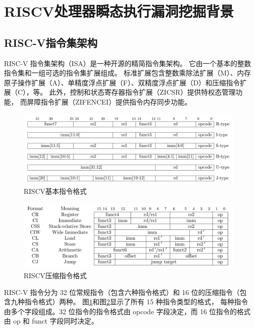 \cleardoublepage

\section{RISCV处理器瞬态执行漏洞挖掘背景}

\subsection{RISC-V指令集架构}

RISC-V 指令集架构（ISA）是一种开源的精简指令集架构\cite{riscv-isa-manual-all}。
它由一个基本的整数指令集和一组可选的指令集扩展组成。
标准扩展包含整数乘除法扩展（M）、内存原子操作扩展（A）、单精度浮点扩展（F）、双精度浮点扩展（D）和压缩指令扩展（C），等。
此外，控制和状态寄存器指令扩展（ZICSR）提供特权态管理功能， 而屏障指令扩展（ZIFENCEI）提供指令内存同步功能。\par

\begin{figure}[!h]
    \centering
    \includegraphics[width=\linewidth]{figure/proposal/riscv-base-instruct-format.png}
    \caption{RISCV基本指令格式}
    \label{review:base-inst}
\end{figure}
\begin{figure}[!h]
    \centering
    \includegraphics[width=\linewidth]{figure/proposal/riscv-compress-instruct-format.png}
    \caption{RISCV压缩指令格式}
    \label{review:compress-inst}
\end{figure}

RISC-V 指令分为 32 位常规指令（包含六种指令格式）和 16 位的压缩指令（包含九种指令格式）两种。 
图\ref{review:base-inst}和图\ref{review:compress-inst}显示了所有 15 种指令类型的格式，
每种指令由多个字段组成。32 位指令的指令格式由 opcode 字段决定，而 16 位指令的格式由 op 和 funct 字段同时决定。\par

